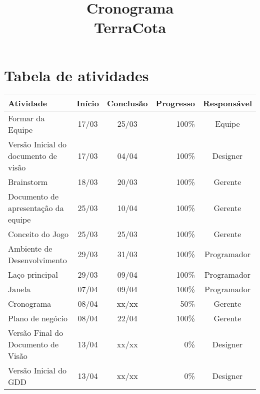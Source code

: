 \documentclass[a4paper, 11pt]{article} %
\title{\textbf{Cronograma \\ TerraCota}} %
\makeatletter
\renewcommand{\maketitle}{ %
\begin{center} %
{\LARGE\@title} %

\vspace{20pt} %

\end{center}
}
\makeatother
\begin{document}
\maketitle %


\section*{Tabela de atividades}

\begin{table}[h]
\centering
\begin{tabular}{lccrc}
\toprule
\textbf{Atividade} & \textbf{Início} & \textbf{Conclusão} & \textbf{Progresso} & \textbf{Responsável} \\
\midrule
Formar da Equipe                     & 17/03 & 25/03 & 100\% & Equipe \\ %
\rowcolor[gray]{0.9}
Versão Inicial do documento de visão & 17/03 & 04/04 & 100\% & Designer \\ %
Brainstorm                           & 18/03 & 20/03 & 100\% & Gerente \\ %
\rowcolor[gray]{0.9}
Documento de apresentação da equipe  & 25/03 & 10/04 & 100\% & Gerente \\ %
Conceito do Jogo                     & 25/03 & 25/03 & 100\% & Gerente \\ %
\rowcolor[gray]{0.9}
Ambiente de Desenvolvimento          & 29/03 & 31/03 & 100\% & Programador \\ %
Laço principal                       & 29/03 & 09/04 & 100\% & Programador \\ %
\rowcolor[gray]{0.9}
Janela                               & 07/04 & 09/04 & 100\% & Programador \\ %
Cronograma                           & 08/04 & xx/xx & 50\%  & Gerente \\ %
\rowcolor[gray]{0.9}
Plano de negócio                     & 08/04 & 22/04 & 100\% & Gerente \\ %
Versão Final do Documento de Visão   & 13/04 & xx/xx & 0\%   & Designer \\ %
\rowcolor[gray]{0.9}
Versão Inicial do GDD                & 13/04 & xx/xx & 0\%   & Designer \\ %

\end{tabular}
\end{table}
\end{document}
